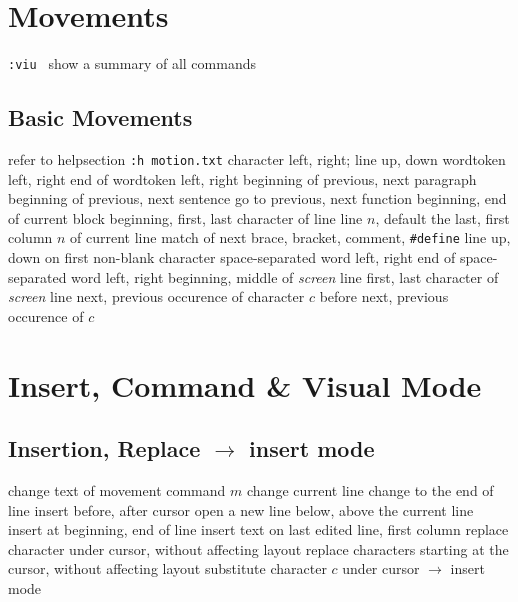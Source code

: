 
\def\content{\uppercase{vim}}
\def\shortcontent{\content}
\def\versionnumber{1.2}  %
\def\version{v\versionnumber\ \month\ \year}


\mytitle

\shortintro
\shortintroVim

\section{Movements}	{{\tt :viu } show a summary of all commands }
\subsection{Basic Movements}{refer to helpsection {\tt :h motion.txt}}
	{character left, right; line up, down }
	{word\or token left, right }
	{end of word\or token left, right}
\cmdS{\lapos\ \rapos }	{beginning of previous, next paragraph}
\cmdS{( ) }	{beginning of previous, next sentence}
\cmdS{[[\ ]]}	{go to previous, next function}
\cmdS{[\lapos\ ]\rapos}	{beginning, end of current block}
	{beginning, first, last character of line}
	{line $n$, default the last, first}
	{column $n$ of current line}
\cmdS{\% }	{match of next brace, bracket, comment, {\tt\#define}}
\cmdS{- + }	{line up, down on first non-blank character}
	{space-separated word left, right}
	{end of space-separated word left, right}
	{beginning, middle of {\it screen\/} line}
	{first, last character of {\it screen\/} line}
	{next, previous occurence of character $c$}
	{before next, previous occurence of $c$}

\section{Insert, Command \& Visual Mode}	{}
\subsection{Insertion, Replace $\to$ insert mode}	{}
	{change text of movement command $m$}
	{change current line}
	{change to the end of line}
	{insert before, after cursor}
	{open a new line below, above the current line}
	{insert at beginning, end of line}
	{insert text on last edited line, first column}
	{replace character under cursor, without affecting layout}
	{replace characters starting at the cursor, without affecting layout}
	{substitute character $c$ under cursor $\to$ insert mode}

